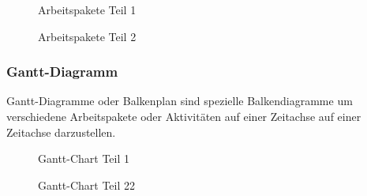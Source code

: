 \begin{figure}[H]
  \centering
  \caption{Arbeitspakete Teil 1}
\end{figure}

\begin{figure}[H]
  \centering
  \caption{Arbeitspakete Teil 2}
\end{figure}

\subsubsection{Gantt-Diagramm}
Gantt-Diagramme oder Balkenplan sind spezielle Balkendiagramme um verschiedene
Arbeitspakete oder Aktivitäten auf einer Zeitachse auf einer Zeitachse
darzustellen.

\begin{sidewaysfigure}
  \centering
  \caption{Gantt-Chart Teil 1}
\end{sidewaysfigure}

\begin{sidewaysfigure}
  \centering
  \caption{Gantt-Chart Teil 22}
\end{sidewaysfigure}